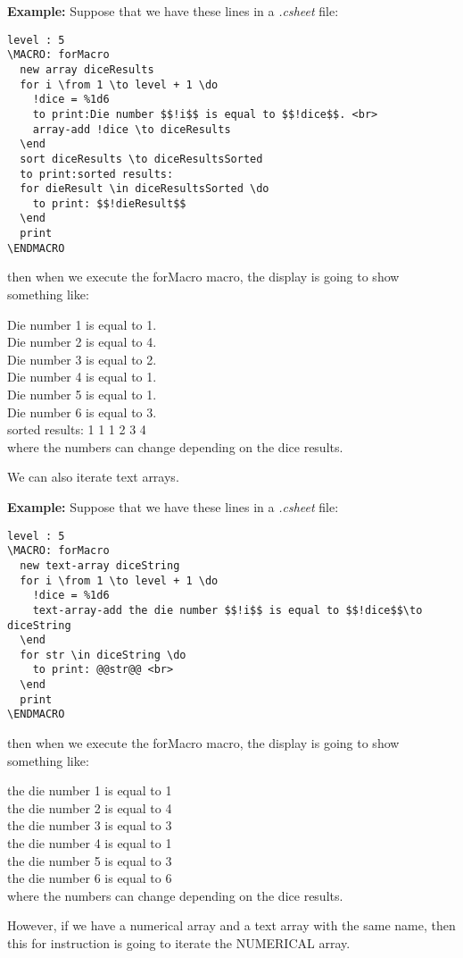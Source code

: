 \documentclass[11pt,a4paper,openright,oneside]{book}
\newenvironment{ex}
{
  \setlength{\parindent}{0cm}
  \large \textbf{Example:} \normalsize 
}
{}
\begin{document}
\begin{ex} Suppose that we have these lines in a \textit{.csheet} file:
  \begin{lstlisting}
level : 5
\MACRO: forMacro
  new array diceResults
  for i \from 1 \to level + 1 \do
    !dice = %1d6
    to print:Die number $$!i$$ is equal to $$!dice$$. <br>
    array-add !dice \to diceResults
  \end
  sort diceResults \to diceResultsSorted
  to print:sorted results:
  for dieResult \in diceResultsSorted \do
    to print: $$!dieResult$$
  \end
  print
\ENDMACRO
  \end{lstlisting}
then when we execute the \textsf{forMacro} macro, the display is going to show something like:
\vspace{5px}

\textsf{Die number 1 is equal to 1.\\
Die number 2 is equal to 4.\\
Die number 3 is equal to 2.\\
Die number 4 is equal to 1.\\
Die number 5 is equal to 1.\\
Die number 6 is equal to 3.\\
sorted results: 1 1 1 2 3 4} \\

where the numbers can change depending on the dice results.

\end{ex}

We can also iterate \textsf{text arrays}.

\begin{ex} Suppose that we have these lines in a \textit{.csheet} file:
  \begin{lstlisting}
level : 5
\MACRO: forMacro
  new text-array diceString
  for i \from 1 \to level + 1 \do
    !dice = %1d6
    text-array-add the die number $$!i$$ is equal to $$!dice$$\to diceString
  \end
  for str \in diceString \do
    to print: @@str@@ <br>
  \end
  print
\ENDMACRO
  \end{lstlisting}
then when we execute the \textsf{forMacro} macro, the display is going to show something like:
\vspace{5px}

\textsf{the die number 1 is equal to 1\\
the die number 2 is equal to 4\\
the die number 3 is equal to 3\\
the die number 4 is equal to 1\\
the die number 5 is equal to 3\\
the die number 6 is equal to 6} \\

where the numbers can change depending on the dice results.

However, if we have a \textsf{numerical array} and a \textsf{text array} with the same name, then this \textsf{for} instruction is going to iterate the \textsf{NUMERICAL array}.

\end{ex}
\end{document}
